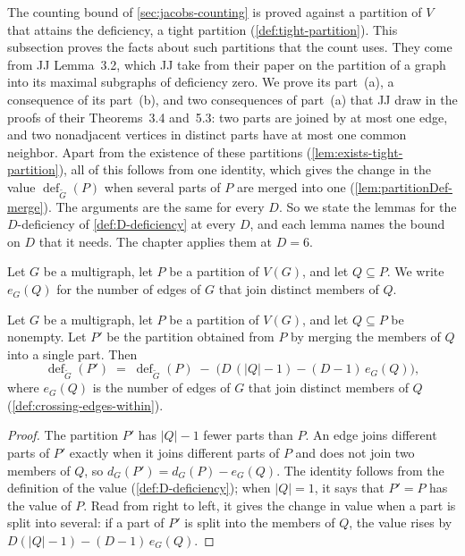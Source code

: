 The counting bound of \cref{sec:jacobs-counting} is proved against a
partition of $V$ that attains the deficiency, a tight partition
(\cref{def:tight-partition}). This subsection proves
the facts about such partitions that the count uses. They come from JJ
Lemma~3.2, which JJ take from their paper on the partition of a graph
into its maximal subgraphs of deficiency zero. We prove its part~(a), a
consequence of its part~(b), and two consequences of part~(a) that JJ
draw in the proofs of their Theorems~3.4 and~5.3: two parts are joined
by at most one edge, and two nonadjacent vertices in distinct parts
have at most one common neighbor. Apart from the existence of these
partitions (\cref{lem:exists-tight-partition}), all of this follows from
one identity, which gives the change in the value
$\operatorname{def}_{\tilde G}(P)$ when several
parts of $P$ are merged into one (\cref{lem:partitionDef-merge}). The
arguments are the same for every $D$. So we state the lemmas for the
$D$-deficiency of \cref{def:D-deficiency} at every $D$, and each lemma
names the bound on $D$ that it needs. The chapter applies them at
$D = 6$.

\begin{definition}
  \label{def:crossing-edges-within}
  \leanok
  Let $G$ be a multigraph, let $P$ be a partition of $V(G)$, and let
  $Q \subseteq P$. We write $e_G(Q)$ for the number of edges of $G$ that
  join distinct members of $Q$.
\end{definition}

\begin{lemma}
  \label{lem:partitionDef-merge}
  \leanok
  Let $G$ be a multigraph, let $P$ be a partition of $V(G)$, and let
  $Q \subseteq P$ be nonempty. Let $P'$ be the partition obtained from
  $P$ by merging the members of $Q$ into a single part. Then
  \[
    \operatorname{def}_{\tilde G}(P') \;=\;
    \operatorname{def}_{\tilde G}(P)
      \;-\; \bigl( D\,(|Q| - 1) - (D-1)\,e_G(Q) \bigr),
  \]
  where $e_G(Q)$ is the number of edges of $G$ that join distinct
  members of $Q$ (\cref{def:crossing-edges-within}).
\end{lemma}
\begin{proof}
  \leanok
  The partition $P'$ has $|Q| - 1$ fewer parts than $P$. An edge joins
  different parts of $P'$ exactly when it joins different parts of $P$
  and does not join two members of $Q$, so
  $d_G(P') = d_G(P) - e_G(Q)$. The identity follows from the definition
  of the value (\cref{def:D-deficiency}); when $|Q| = 1$, it says that
  $P' = P$ has the value of $P$. Read from right to left, it
  gives the change in value when a part is split into several: if a
  part of $P'$ is split into the members of $Q$, the value rises by
  $D(|Q| - 1) - (D-1)\,e_G(Q)$.
\end{proof}


